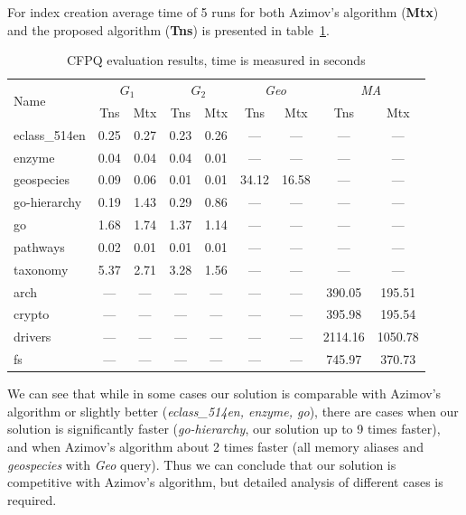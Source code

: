 For index creation average time of 5 runs for both Azimov's algorithm (\textbf{Mtx}) and the proposed algorithm (\textbf{Tns}) is presented in table~\ref{tbl:CFPQ_index}.

{\setlength{\tabcolsep}{0.2em}
  \begin{table}
    \caption{CFPQ evaluation results, time is measured in seconds}
    \label{tbl:CFPQ_index}
    \small
    \begin{tabular}{| l | c | c | c | c | c | c | c | c |}
      \hline
      
      \multirow{2}{*}{Name}  & \multicolumn{2}{c|}{$G_1$} & \multicolumn{2}{c|}{$G_2$} & \multicolumn{2}{c|}{\textit{Geo}} & \multicolumn{2}{c|}{\textit{MA}}\\
      \cline{2-9}
                      & Tns    & Mtx    & Tns  & Mtx  & Tns   & Mtx   & Tns     & Mtx \\
      \hline
      \hline
      eclass\_514en   & 0.25   & 0.27   & 0.23 & 0.26 & ---   & ---   & ---     & ---\\
      enzyme          & 0.04   & 0.04   & 0.04 & 0.01 & ---   & ---   & ---     & ---\\
      geospecies      & 0.09   & 0.06   & 0.01 & 0.01 & 34.12 & 16.58 & ---     & ---\\
      go-hierarchy    & 0.19   & 1.43   & 0.29 & 0.86 & ---   & ---   & ---     & ---\\
      go              & 1.68   & 1.74   & 1.37 & 1.14 & ---   & ---   & ---     & ---\\
      pathways        & 0.02   & 0.01   & 0.01 & 0.01 & ---   & ---   & ---     & ---\\
      taxonomy        & 5.37   & 2.71   & 3.28 & 1.56 & ---   & ---   & ---     & ---\\
      \hline
      arch            & ---    & ---    & ---  & ---  & ---   & ---   & 390.05  & 195.51  \\
      crypto          & ---    & ---    & ---  & ---  & ---   & ---   & 395.98  & 195.54  \\
      drivers         & ---    & ---    & ---  & ---  & ---   & ---   & 2114.16 & 1050.78 \\
      fs              & ---    & ---    & ---  & ---  & ---   & ---   & 745.97  & 370.73  \\
      \hline
    \end{tabular}
  \end{table}
}

We can see that while in some cases our solution is comparable with Azimov's algorithm or slightly better (\textit{eclass\_514en, enzyme, go}), there are cases when our solution is significantly faster (\textit{go-hierarchy}, our solution up to 9 times faster), and when Azimov's algorithm about 2 times faster (all memory aliases and \textit{geospecies} with \textit{Geo} query). 
Thus we can conclude that our solution is competitive with Azimov's algorithm, but detailed analysis of different cases is required.

